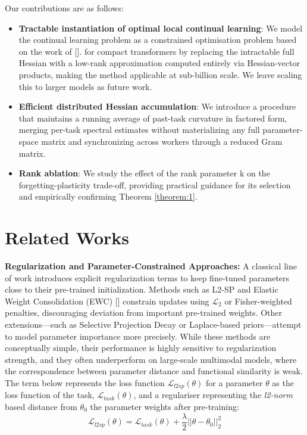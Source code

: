 Our contributions are as follows:

\begin{itemize}

  \item[1.] \textbf{Tractable instantiation of optimal local continual learning}: We model the continual learning problem as a constrained optimisation problem based on the work of  [\cite{lanzillotta2024local}]. for compact transformers by replacing the intractable full Hessian with a low-rank approximation computed entirely via Hessian-vector products, making the method applicable at sub-billion scale. We leave scaling this to larger models as future work.

  \item[2.] \textbf{Efficient distributed Hessian accumulation}: We introduce a procedure that maintains a running average of past-task curvature in factored form, merging per-task spectral estimates without materializing any full parameter-space matrix and synchronizing across workers through a reduced Gram matrix.

  \item[4.] \textbf{Rank ablation}: We study the effect of the rank parameter k on the forgetting-plasticity trade-off, providing practical guidance for its selection and empirically confirming Theorem \ref{theorem:1}.

\end{itemize}


\section{Related Works}
\label{sec:relatedworks}

\noindent \textbf{Regularization and Parameter-Constrained Approaches:} 
A classical line of work introduces explicit regularization terms to keep fine-tuned parameters close to their pre-trained initialization. Methods such as L2-SP and Elastic Weight Consolidation (EWC) [\cite{Kirkpatrick_2017}] constrain updates using $\mathcal{L}_2$ or Fisher-weighted penalties, discouraging deviation from important pre-trained weights.
Other extensions—such as Selective Projection Decay or Laplace-based priors—attempt to model parameter importance more precisely. While these methods are conceptually simple, their performance is highly sensitive to regularization strength, and they often underperform on large-scale multimodal models, where the correspondence between parameter distance and functional similarity is weak. The term below represents the loss function $\mathcal{L}_{l2sp}(\theta)$ for a parameter $\theta$ as the loss function of the task, $\mathcal{L}_{task}(\theta)$, and a regulariser representing the \textit{l2-norm} based distance from $\theta_0$ the parameter weights after pre-training:
$$
\mathcal{L}_{l2sp}(\theta) = \mathcal{L}_{task}(\theta) + \frac{\lambda}{2}||\theta - \theta_0||^2_2
$$

